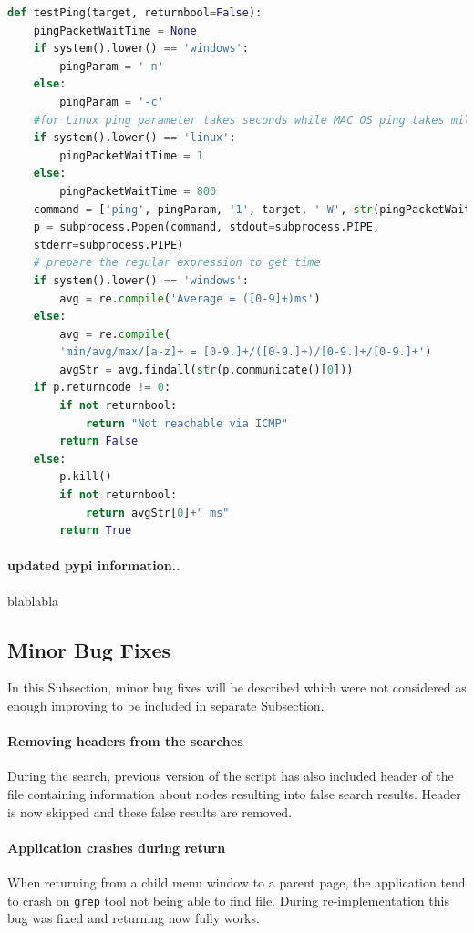 {{{{{{{\noindent\begin{minipage}{\linewidth}
		\begin{lstlisting}[language=Python, numbers=none, label={lst:testping}, caption=Multi-Platform Function testPing, frame=single, showstringspaces=false, breaklines=true]
def testPing(target, returnbool=False):
	pingPacketWaitTime = None
	if system().lower() == 'windows':
		pingParam = '-n'
	else:
		pingParam = '-c'
	#for Linux ping parameter takes seconds while MAC OS ping takes miliseconds
	if system().lower() == 'linux':
		pingPacketWaitTime = 1
	else:
		pingPacketWaitTime = 800
	command = ['ping', pingParam, '1', target, '-W', str(pingPacketWaitTime)]
	p = subprocess.Popen(command, stdout=subprocess.PIPE,
	stderr=subprocess.PIPE)
	# prepare the regular expression to get time
	if system().lower() == 'windows':
		avg = re.compile('Average = ([0-9]+)ms')
	else:
		avg = re.compile(
		'min/avg/max/[a-z]+ = [0-9.]+/([0-9.]+)/[0-9.]+/[0-9.]+')
		avgStr = avg.findall(str(p.communicate()[0]))
	if p.returncode != 0:
		if not returnbool:
			return "Not reachable via ICMP"
		return False
	else:
		p.kill()
		if not returnbool:
			return avgStr[0]+" ms"
		return True
		\end{lstlisting}
	\end{minipage}

\paragraph{updated pypi information..}
blablabla

\subsection{Minor Bug Fixes}
In this Subsection, minor bug fixes will be described which were not considered as enough improving to be included in separate Subsection. 
\paragraph{Removing headers from the searches}
During the search, previous version of the script has also included header of the file containing information about nodes resulting into false search results. Header is now skipped and these false results are removed.
\paragraph{Application crashes during return}
When returning from a child menu window to a parent page, the application tend to crash on \texttt{grep} tool not being able to find file. During re-implementation this bug was fixed and returning now fully works.

}}}}}}}
